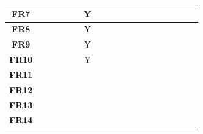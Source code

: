 \documentclass{article}
\begin{document}
\begin{table}[H]
\begin{adjustwidth}{-1.87in}{-1in}
\begin{tabular}{c|c|c|c|c|c|c|c|c|c|c|c|c|c|c|c|c|c|c|}
\multicolumn{1}{|c|}{\textbf{FR7}}  &              &              &              &              &              & Y            &              &              &              &              &              &              &              &              &             &             &             &             \\ \hline
\multicolumn{1}{|c|}{\textbf{FR8}}  &              &              &              &              &              & Y            &              &              &              &              &              &              &              &              &             &             &             &             \\ \hline
\multicolumn{1}{|c|}{\textbf{FR9}}  &              &              &              &              &              & Y            &              &              &              &              &              &              &              &              &             &             &             &             \\ \hline
\multicolumn{1}{|c|}{\textbf{FR10}} &              &              &              &              &              & Y            &              &              &              &              &              &              &              &              &             &             &             &             \\ \hline
\multicolumn{1}{|c|}{\textbf{FR11}} &              &              &              &              &              &              &              &              &              &              &              &              &              &              &             &             &             &             \\ \hline
\multicolumn{1}{|c|}{\textbf{FR12}} &              &              &              &              &              &              &              &              &              &              &              &              &              &              &             &             &             &             \\ \hline
\multicolumn{1}{|c|}{\textbf{FR13}} &              &              &              &              &              &              &              &              &              &              &              &              &              &              &             &             &             &             \\ \hline
\multicolumn{1}{|c|}{\textbf{FR14}} &              &              &              &              &              &              &              &              &              &              &              &              &              &              &             &             &             &             \\ \hline

\end{tabular}
\end{adjustwidth}
\end{table}
\end{document}
